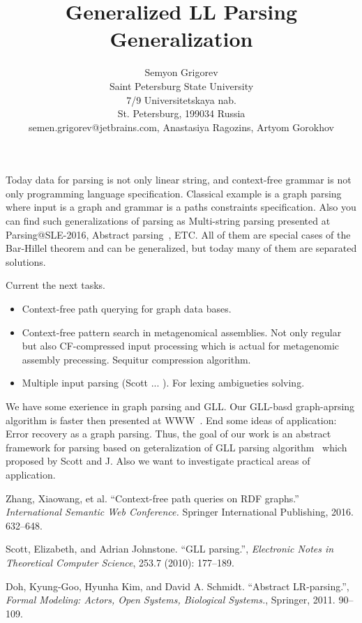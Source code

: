 \documentclass[12pt]{article}  %
\title{Generalized LL Parsing Generalization}
\author{Semyon Grigorev
\\
       {Saint Petersburg State University}\\
       {7/9 Universitetskaya nab.}\\
       {St. Petersburg, 199034 Russia}\\
       {semen.grigorev@jetbrains.com}, 
       Anastasiya Ragozins, Artyom Gorokhov}
\theoremstyle{definition}
\theoremstyle{remark}
\begin{document}
\maketitle

Today data for parsing is not only linear string, and context-free grammar is not only programming language specification.
Classical example is a graph parsing where input is a graph and grammar is a paths constraints specification.
Also you can find such generalizations of parsing as Multi-string parsing presented at Parsing@SLE-2016, Abstract parsing~\cite{AbstractParsing}, ETC.
All of them are special cases of the Bar-Hillel theorem and can be generalized, but today many of them are separated solutions.

 Current the next tasks.
\begin{itemize}
\item Context-free path querying for graph data bases. 
\item Context-free pattern search in metagenomical assemblies. Not only regular but also CF-compressed input processing which is actual for metagenomic assembly precessing. 
Sequitur compression algorithm.
\item Multiple input parsing (Scott ... ). For lexing ambigueties solving.
\end{itemize}

We have some exerience in graph parsing and GLL. Our GLL-basd graph-aprsing algorithm is faster 
then presented at WWW~\cite{CFRDFParsing}.  End some ideas of application: Error recovery as a 
graph parsing. 
Thus, the goal of our work is an abstract framework for parsing based on geteralization of GLL parsing 
algorithm~\cite{GLL} which proposed by Scott and J.  Also we want to investigate practical areas of 
application.

\begin{thebibliography}{9}

  Zhang, Xiaowang, et al.
  ``Context-free path queries on RDF graphs.'' 
  \emph{International Semantic Web Conference.}
   Springer International Publishing, 2016.
   632--648.

  Scott, Elizabeth, and Adrian Johnstone.   
  ``GLL parsing.'',
  \emph{Electronic Notes in Theoretical Computer Science},
  253.7 (2010): 177--189.

  Doh, Kyung-Goo, Hyunha Kim, and David A. Schmidt.
  ``Abstract LR-parsing.'',
  \emph{Formal Modeling: Actors, Open Systems, Biological Systems.},
  Springer,
  2011.
  90--109.

\end{thebibliography}
\end{document}
